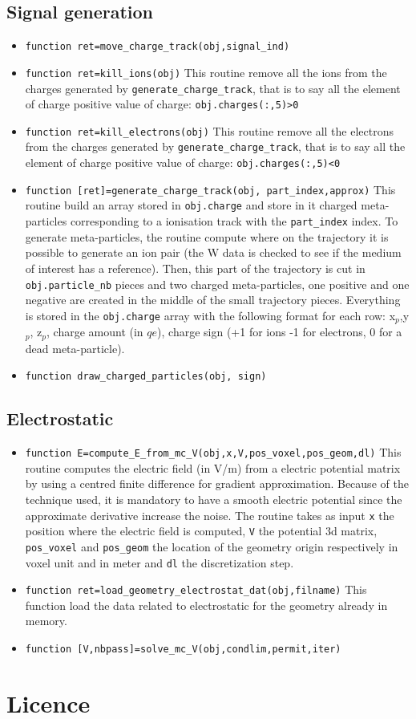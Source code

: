 \documentclass[10pt]{article}
\begin{document}
		\subsection{Signal generation}
		\begin{itemize}
		\item \lstinline{function ret=move_charge_track(obj,signal_ind)}
		\item \lstinline{function ret=kill_ions(obj)} This routine remove all the ions from the charges generated by \lstinline{generate_charge_track}, that is to say all the element of charge positive value of charge: \lstinline{obj.charges(:,5)>0}
		\item \lstinline{function ret=kill_electrons(obj)} This routine remove all the electrons from the charges generated by \lstinline{generate_charge_track}, that is to say all the element of charge positive value of charge: \lstinline{obj.charges(:,5)<0}
		\item \lstinline{function [ret]=generate_charge_track(obj, part_index,approx)} This routine build an array stored in \lstinline{obj.charge} and store in it charged meta-particles corresponding to a ionisation track with the \lstinline{part_index} index. To generate meta-particles, the routine compute where on the trajectory it is possible to generate an ion pair (the W data is checked to see if the medium of interest has a reference). Then, this part of the trajectory is cut in \lstinline{obj.particle_nb} pieces and two charged meta-particles, one positive and one negative are created in the middle of the small trajectory pieces. Everything is stored in the \lstinline{obj.charge} array with the following format for each row: x$_p$,y$_p$, z$_p$, charge amount (in $qe$), charge sign (+1 for ions -1 for electrons, 0 for a dead meta-particle).
		\item \lstinline{function draw_charged_particles(obj, sign)}
		\end{itemize}
		\subsection{Electrostatic}
		\begin{itemize}
		\item \lstinline{function E=compute_E_from_mc_V(obj,x,V,pos_voxel,pos_geom,dl)} This routine computes the electric field  (in V/m) from a electric potential matrix by using a centred finite difference for gradient approximation. Because of the technique used, it is mandatory to have a smooth electric potential since the approximate derivative increase the noise. The routine takes as input \lstinline{x} the position where the electric field is computed, \lstinline{V} the potential 3d matrix, \lstinline{pos_voxel} and \lstinline{pos_geom} the location of the geometry origin respectively in voxel unit and in meter and \lstinline{dl} the discretization step. 
		\item \lstinline{function ret=load_geometry_electrostat_dat(obj,filname)} This function load the data related to electrostatic for the geometry already in memory.
		\item \lstinline{function [V,nbpass]=solve_mc_V(obj,condlim,permit,iter)} 
		\end{itemize}
		
		
		
	\section{Licence} 
	
	
	
\end{document}
